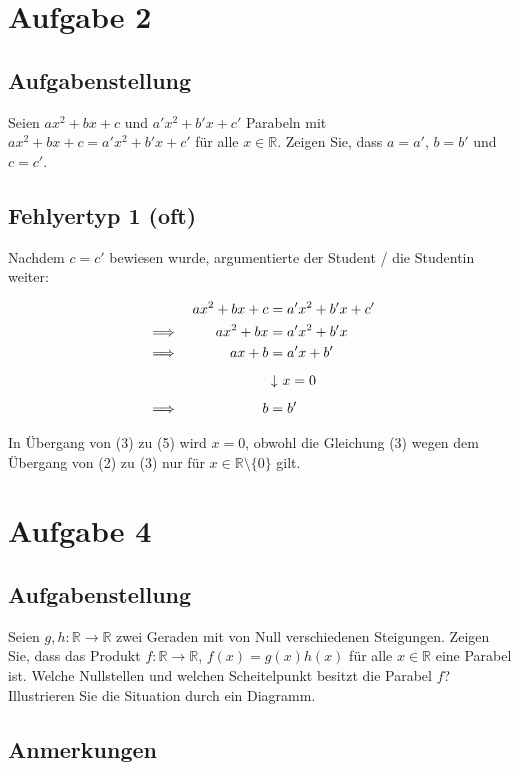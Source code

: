 \documentclass[a4paper]{article}
\newcommand*{\R}{\mathbb R}
\begin{document}
\section{Aufgabe 2}

\subsection{Aufgabenstellung}

Seien $ax^2+bx+c$ und $a'x^2+b'x+c'$ Parabeln mit $ax^2+bx+c=a'x^2+b'x+c'$ für alle $x\in\R$. Zeigen Sie, dass $a=a'$, $b=b'$ und $c=c'$.

\subsection{Fehlyertyp 1 (oft)}

Nachdem $c=c'$ bewiesen wurde, argumentierte der Student / die Studentin weiter:

\begin{align}
  && ax^2+bx+c & = a'x^2+b'x+c' \\
  &\implies & ax^2+bx &= a'x^2 +b'x \\
  &\implies & ax+b & = a'x+b' \\[0.5em]
  &&& \left\downarrow\ x=0 \right. \\[0.5em]
  &\implies & b&=b'
\end{align}

In Übergang von (3) zu (5) wird $x=0$, obwohl die Gleichung (3) wegen dem Übergang von (2) zu (3) nur für $x\in\R\setminus\{0\}$ gilt.

\section{Aufgabe 4}

\subsection{Aufgabenstellung}

Seien $g,h:\R\to\R$ zwei Geraden mit von Null verschiedenen Steigungen. Zeigen Sie, dass das Produkt $f:\R\to\R$, $f(x)=g(x)h(x)$ für alle $x\in\R$ eine Parabel ist. Welche Nullstellen und welchen Scheitelpunkt besitzt die Parabel $f$? Illustrieren Sie die Situation durch ein Diagramm.

\subsection{Anmerkungen}
\end{document}
